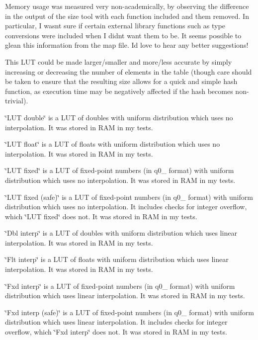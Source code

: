 \begin{DoxyEnumerate}
\item Memory usage was measured very non-\/academically, by observing the difference in the output of the {\ttfamily size} tool with each function included and them removed. In particular, I wasn\textquotesingle{}t sure if certain external library functions such as type conversions were included when I didn\textquotesingle{}t want them to be. It seems possible to glean this information from the map file. I\textquotesingle{}d love to hear any better suggestions!
\item This L\+UT could be made larger/smaller and more/less accurate by simply increasing or decreasing the number of elements in the table (though care should be taken to ensure that the resulting size allows for a quick and simple hash function, as execution time may be negatively affected if the hash becomes non-\/trivial).
\item \char`\"{}\+L\+U\+T double\char`\"{} is a L\+UT of doubles with uniform distribution which uses no interpolation. It was stored in R\+AM in my tests.
\item \char`\"{}\+L\+U\+T float\char`\"{} is a L\+UT of floats with uniform distribution which uses no interpolation. It was stored in R\+AM in my tests.
\item \char`\"{}\+L\+U\+T fixed\char`\"{} is a L\+UT of fixed-\/point numbers (in q0\+\_ format) with uniform distribution which uses no interpolation. It was stored in R\+AM in my tests.
\item \char`\"{}\+L\+U\+T fixed (safe)\char`\"{} is a L\+UT of fixed-\/point numbers (in q0\+\_ format) with uniform distribution which uses no interpolation. It includes checks for integer overflow, which \char`\"{}\+L\+U\+T fixed\char`\"{} does not. It was stored in R\+AM in my tests.
\item \char`\"{}\+Dbl interp\char`\"{} is a L\+UT of doubles with uniform distribution which uses linear interpolation. It was stored in R\+AM in my tests.
\item \char`\"{}\+Flt interp\char`\"{} is a L\+UT of floats with uniform distribution which uses linear interpolation. It was stored in R\+AM in my tests.
\item \char`\"{}\+Fxd interp\char`\"{} is a L\+UT of fixed-\/point numbers (in q0\+\_ format) with uniform distribution which uses linear interpolation. It was stored in R\+AM in my tests.
\item \char`\"{}\+Fxd interp (safe)\char`\"{} is a L\+UT of fixed-\/point numbers (in q0\+\_ format) with uniform distribution which uses linear interpolation. It includes checks for integer overflow, which \char`\"{}\+Fxd interp\char`\"{} does not. It was stored in R\+AM in my tests.

\end{DoxyEnumerate}
